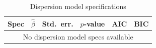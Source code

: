 \begin{table}[htbp]
\centering
\caption{Dispersion model specifications}
\label{tab:dispersion_models}
\begin{tabular}{lrrrrr}
\toprule
\textbf{Spec} & $\hat{\beta}$ & \textbf{Std.\ err.} & \textbf{$p$-value} & \textbf{AIC} & \textbf{BIC} \\
\midrule
\multicolumn{6}{c}{No dispersion model specs available} \\
\bottomrule
\end{tabular}
\end{table}
